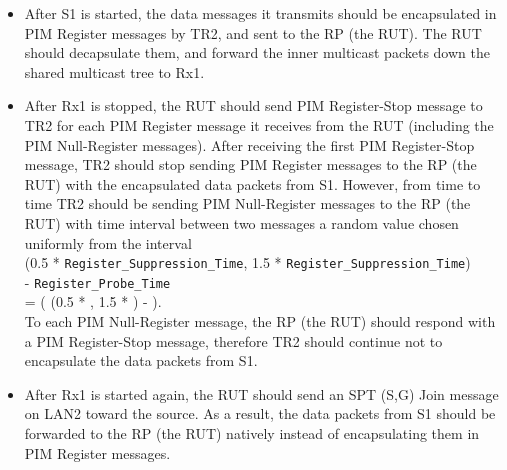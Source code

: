 \documentclass[11pt]{report}
\begin{document}


\begin{itemize}

  \item After S1 is started, the data messages it transmits should be
  encapsulated in PIM Register messages by TR2, and sent to the RP (the
  RUT). The RUT should decapsulate them, and forward the inner multicast
  packets down the shared multicast tree to Rx1.

  \item After Rx1 is stopped, the RUT should send PIM Register-Stop message to
  TR2 for each PIM Register message it receives from the RUT (including
  the PIM Null-Register messages). After receiving the first PIM Register-Stop
  message, TR2 should stop sending PIM Register messages to the RP (the RUT)
  with the encapsulated data packets from S1.
  However, from time to time TR2 should be sending PIM Null-Register
  messages to the RP (the RUT) with time interval between two messages a random
  value chosen uniformly from the interval \\
  (0.5 * \verb=Register_Suppression_Time=,
  1.5 * \verb=Register_Suppression_Time=) \\
  - \verb=Register_Probe_Time= \\
  = ( (0.5 * {\PimsmRegisterSuppressionTime}, 1.5 *
  {\PimsmRegisterSuppressionTime}) - {\PimsmRegisterProbeTime} ). \\
  To each PIM Null-Register message, the RP (the RUT) should respond with a
  PIM Register-Stop message, therefore TR2 should continue not to
  encapsulate the data packets from S1.

  \item After Rx1 is started again, the RUT should send an SPT (S,G) Join
  message on LAN2 toward the source. As a result, the data packets from S1
  should be forwarded to the RP (the RUT) natively instead of encapsulating
  them in PIM Register messages.

\end{itemize}

\end{document}
